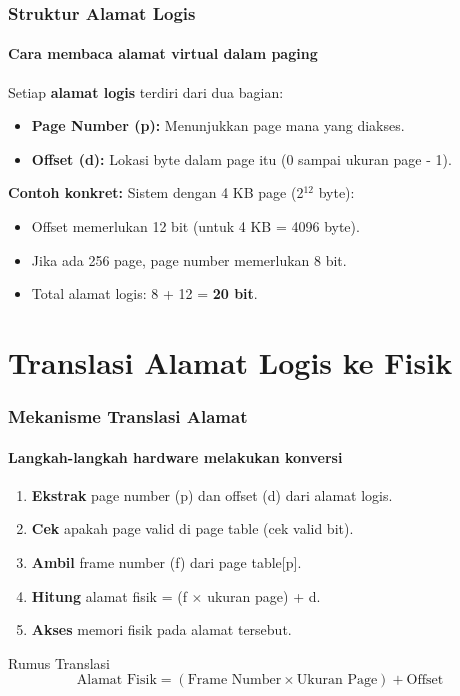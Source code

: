 \documentclass[t,aspectratio=169,xcolor=dvipsnames]{beamer}
\begin{document}
\begin{frame}
    \frametitle{Struktur Alamat Logis}
    \framesubtitle{Cara membaca alamat virtual dalam paging}
    \small

    Setiap \textbf{alamat logis} terdiri dari dua bagian:

    \vspace{0.3cm}
    \begin{center}
    \end{center}

    \vspace{0.3cm}
    \begin{itemize}
        \item \textbf{Page Number (p):} Menunjukkan page mana yang diakses.
        \item \textbf{Offset (d):} Lokasi byte dalam page itu (0 sampai ukuran page - 1).
    \end{itemize}

    \vspace{0.2cm}
    \textbf{Contoh konkret:} Sistem dengan 4 KB page (2$^{12}$ byte):
    \begin{itemize}
        \item Offset memerlukan 12 bit (untuk 4 KB = 4096 byte).
        \item Jika ada 256 page, page number memerlukan 8 bit.
        \item Total alamat logis: 8 + 12 = \textbf{20 bit}.
    \end{itemize}
\end{frame}

\section{Translasi Alamat Logis ke Fisik}

\begin{frame}
    \frametitle{Mekanisme Translasi Alamat}
    \framesubtitle{Langkah-langkah hardware melakukan konversi}
    \small

    \begin{enumerate}
        \item \textbf{Ekstrak} page number (p) dan offset (d) dari alamat logis.
        \item \textbf{Cek} apakah page valid di page table (cek valid bit).
        \item \textbf{Ambil} frame number (f) dari page table[p].
        \item \textbf{Hitung} alamat fisik = (f $\times$ ukuran page) + d.
        \item \textbf{Akses} memori fisik pada alamat tersebut.
    \end{enumerate}

    \vspace{0.2cm}
    \begin{alertblock}{Rumus Translasi}
        \[
        \text{Alamat Fisik} = (\text{Frame Number} \times \text{Ukuran Page}) + \text{Offset}
        \]
    \end{alertblock}
\end{frame}
\end{document}
